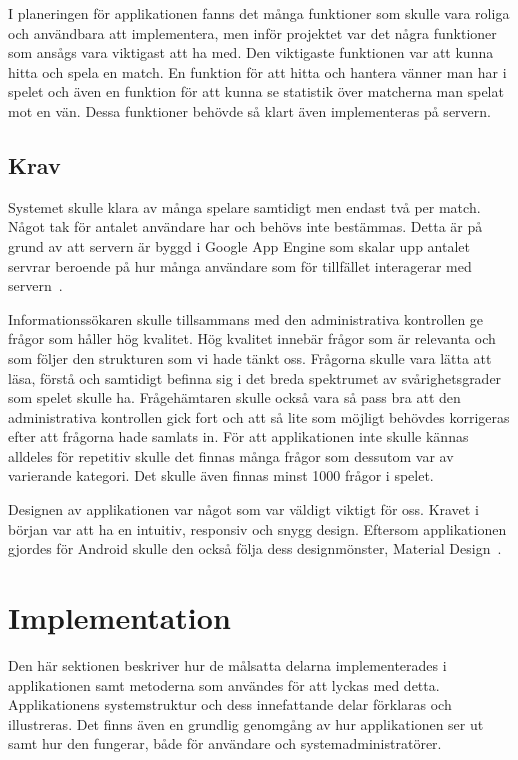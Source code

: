 \documentclass[a4paper, 11pt]{article}
\begin{document}
I planeringen för applikationen fanns det många funktioner som skulle vara roliga och användbara att implementera, men inför projektet var det några funktioner som ansågs vara viktigast att ha med. Den viktigaste funktionen var att kunna hitta och spela en match. En funktion för att hitta och hantera vänner man har i spelet och även en funktion för att kunna se statistik över matcherna man spelat mot en vän. Dessa funktioner behövde så klart även implementeras på servern.

\subsection{Krav}
Systemet skulle klara av många spelare samtidigt men endast två per match. Något tak för antalet användare har och behövs inte bestämmas. Detta är på grund av att servern är byggd i Google App Engine som skalar upp antalet servrar beroende på hur många användare som för tillfället interagerar med servern~\cite{appenginescalability}. 

Informationssökaren skulle tillsammans med den administrativa kontrollen ge frågor som håller hög kvalitet. Hög kvalitet innebär frågor som är relevanta och som följer den strukturen som vi hade tänkt oss. Frågorna skulle vara lätta att läsa, förstå och samtidigt befinna sig i det breda spektrumet av svårighetsgrader som spelet skulle ha. Frågehämtaren skulle också vara så pass bra att den administrativa kontrollen gick fort och att så lite som möjligt behövdes korrigeras efter att frågorna hade samlats in. För att applikationen inte skulle kännas alldeles för repetitiv skulle det finnas många frågor som dessutom var av varierande kategori. Det skulle även finnas minst 1000 frågor i spelet.

Designen av applikationen var något som var väldigt viktigt för oss. Kravet i början var att ha en intuitiv, responsiv och snygg design. Eftersom applikationen gjordes för Android skulle den också följa dess designmönster, Material Design~\cite{MaterialDesign}.

\section{Implementation}
Den här sektionen beskriver hur de målsatta delarna implementerades i applikationen samt metoderna som användes för att lyckas med detta. Applikationens systemstruktur och dess innefattande delar förklaras och illustreras. Det finns även en grundlig genomgång av hur applikationen ser ut samt hur den fungerar, både för användare och systemadministratörer.
\end{document}
